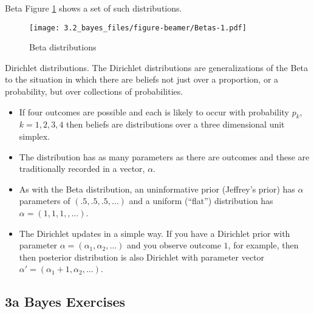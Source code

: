 \documentclass[
  11pt,
  ignorenonframetext,
]{beamer}
\begin{document}
\begin{frame}{Beta}
\protect\hypertarget{beta-1}{}
Figure \ref{betas} shows a set of such distributions.

\begin{figure}

{\centering \texttt{[image: 3.2\_bayes\_files/figure-beamer/Betas-1.pdf]}

}

\caption{\label{betas} Beta distributions}

\end{figure}
\end{frame}

\begin{frame}{Dirichlet distributions.}
\protect\hypertarget{dirichlet-distributions.}{}
The Dirichlet distributions are generalizations of the Beta to the
situation in which there are beliefs not just over a proportion, or a
probability, but over collections of probabilities.

\begin{itemize}
\item
  If four outcomes are possible and each is likely to occur with
  probability \(p_k\), \(k=1,2,3,4\) then beliefs are distributions over
  a three dimensional unit simplex.
\item
  The distribution has as many parameters as there are outcomes and
  these are traditionally recorded in a vector, \(\alpha\).
\item
  As with the Beta distribution, an uninformative prior (Jeffrey's
  prior) has \(\alpha\) parameters of \((.5,.5,.5, \dots)\) and a
  uniform (``flat'') distribution has \(\alpha = (1,1,1,,\dots)\).
\item
  The Dirichlet updates in a simple way. If you have a Dirichlet prior
  with parameter \(\alpha = (\alpha_1, \alpha_2, \dots)\) and you
  observe outcome \(1\), for example, then then posterior distribution
  is also Dirichlet with parameter vector
  \(\alpha' = (\alpha_1+1, \alpha_2,\dots)\).
\end{itemize}
\end{frame}

\hypertarget{a-bayes-exercises}{%
\subsection{3a Bayes Exercises}\label{a-bayes-exercises}}
\end{document}
